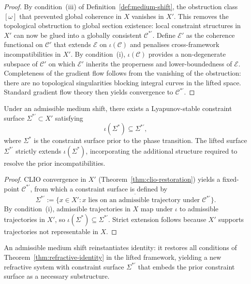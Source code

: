\documentclass[11pt,openany]{book}
\begin{document}
\begin{proof}
By condition~(iii) of Definition~\ref{def:medium-shift},
the obstruction class $[\omega]$ that prevented global
coherence in $X$ vanishes in $X'$.  This removes the
topological obstruction to global section existence:
local constraint structures in $X'$ can now be glued into
a globally consistent $\mathcal{C}^{*\prime}$.  Define
$\mathcal{E}'$ as the coherence functional on $\mathcal{C}'$
that extends $\mathcal{E}$ on $\iota(\mathcal{C})$ and
penalises cross-framework incompatibilities in $X'$.  By
condition~(i), $\iota(\mathcal{C})$ provides a
non-degenerate subspace of $\mathcal{C}'$ on which
$\mathcal{E}'$ inherits the properness and lower-boundedness
of $\mathcal{E}$.  Completeness of the gradient flow follows
from the vanishing of the obstruction: there are no
topological singularities blocking integral curves in the
lifted space.  Standard gradient flow theory then yields
convergence to $\mathcal{C}^{*\prime}$.
\end{proof}

\begin{corollary}
\label{cor:lifted-surface}
Under an admissible medium shift, there exists a
Lyapunov-stable constraint surface $\Sigma^{*\prime}
\subset X'$ satisfying
\[
  \iota(\Sigma^*) \subseteq \Sigma^{*\prime},
\]
where $\Sigma^*$ is the constraint surface prior to the
phase transition.  The lifted surface $\Sigma^{*\prime}$
strictly extends $\iota(\Sigma^*)$, incorporating the
additional structure required to resolve the prior
incompatibilities.
\end{corollary}

\begin{proof}
CLIO convergence in $X'$ (Theorem~\ref{thm:clio-restoration})
yields a fixed-point $\mathcal{C}^{*\prime}$, from which a
constraint surface is defined by
\[
  \Sigma^{*\prime} := \overline{\bigl\{x \in X' :
    x \text{ lies on an admissible trajectory under }
    \mathcal{C}^{*\prime}\bigr\}}.
\]
By condition~(i), admissible trajectories in $X$ map under
$\iota$ to admissible trajectories in $X'$, so
$\iota(\Sigma^*) \subseteq \Sigma^{*\prime}$.  Strict
extension follows because $X'$ supports trajectories not
representable in $X$.
\end{proof}

\begin{corollary}
\label{cor:identity-reinstated}
An admissible medium shift reinstantiates identity: it
restores all conditions of Theorem~\ref{thm:refractive-identity}
in the lifted framework, yielding a new refractive system
with constraint surface $\Sigma^{*\prime}$ that embeds the
prior constraint surface as a necessary substructure.
\end{corollary}
\end{document}
